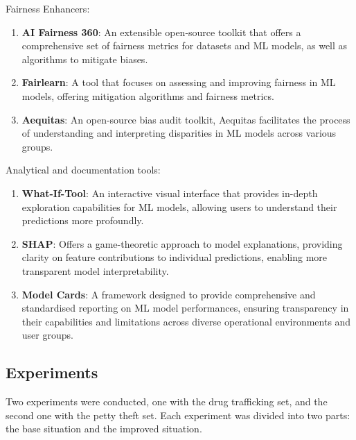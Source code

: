 \documentclass[fleqn,10pt]{wlscirep}
\begin{document}
Fairness Enhancers:

\begin{enumerate}

    \item \textbf{AI Fairness 360}: An extensible open-source toolkit that offers a comprehensive set of fairness metrics for datasets and ML models, as well as algorithms to mitigate biases.

    \item \textbf{Fairlearn}: A tool that focuses on assessing and improving fairness in ML models, offering mitigation algorithms and fairness metrics.

    \item \textbf{Aequitas}: An open-source bias audit toolkit, Aequitas facilitates the process of understanding and interpreting disparities in ML models across various groups.
\end{enumerate}

Analytical and documentation tools:

\begin{enumerate}
    \item \textbf{What-If-Tool}: An interactive visual interface that provides in-depth exploration capabilities for ML models, allowing users to understand their predictions more profoundly.

    \item \textbf{SHAP}: Offers a game-theoretic approach to model explanations, providing clarity on feature contributions to individual predictions, enabling more transparent model interpretability.

    \item \textbf{Model Cards}: A framework designed to provide comprehensive and standardised reporting on ML model performances, ensuring transparency in their capabilities and limitations across diverse operational environments and user groups.
\end{enumerate}

\subsection{Experiments}

Two experiments were conducted, one with the drug trafficking set, and the second one with the petty theft set. Each experiment was divided into two parts: the base situation and the improved situation.
\end{document}
